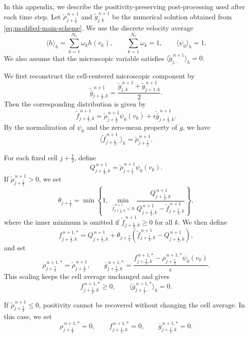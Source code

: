 \documentclass[11pt,twoside]{article}
\numberwithin{equation}{section}
\theoremstyle{plain}
\theoremstyle{nonumberplain}
\begin{document}
{In this appendix, we describe the positivity-preserving post-processing
used after each time step. Let
\(\tilde{\rho}_{j+\frac12}^{\,n+1}\) and
\(\tilde g_{j,k}^{\,n+1}\) be the numerical solution obtained from
\eqref{eq:modified-main-scheme}. We use the discrete velocity average
\[
    \langle h\rangle_h
    =
    \sum_{k=1}^{N_v}\omega_k h(v_k),
    \qquad
    \sum_{k=1}^{N_v}\omega_k=1,
    \qquad
    \langle \psi_0\rangle_h=1 .
\]
We also assume that the microscopic variable satisfies
\(\langle \tilde g_{j,\cdot}^{\,n+1}\rangle_h=0\).

We first reconstruct the cell-centered microscopic component by
\[
    \tilde{\bar g}_{j+\frac12,k}^{\,n+1}
    =
    \frac{
    \tilde g_{j,k}^{\,n+1}
    +
    \tilde g_{j+1,k}^{\,n+1}
    }{2}.
\]
Then the corresponding distribution is given by
\[
    \tilde f_{j+\frac12,k}^{\,n+1}
    =
    \tilde\rho_{j+\frac12}^{\,n+1}\psi_0(v_k)
    +
    \epsilon \tilde{\bar g}_{j+\frac12,k}^{\,n+1}.
\]
By the normalization of \(\psi_0\) and the zero-mean property of \(g\),
we have
\[
    \langle \tilde f_{j+\frac12,\cdot}^{\,n+1}\rangle_h
    =
    \tilde\rho_{j+\frac12}^{\,n+1}.
\]

For each fixed cell \(j+\frac12\), define
\[
    Q_{j+\frac12,k}^{\,n+1}
    =
    \tilde\rho_{j+\frac12}^{\,n+1}\psi_0(v_k).
\]
If \(\tilde\rho_{j+\frac12}^{\,n+1}>0\), we set
\[
    \theta_{j+\frac12}
    =
    \min\left\{
    1,\,
    \min_{\tilde f_{j+\frac12,k}^{\,n+1}<0}
    \frac{
    Q_{j+\frac12,k}^{\,n+1}
    }{
    Q_{j+\frac12,k}^{\,n+1}
    -
    \tilde f_{j+\frac12,k}^{\,n+1}
    }
    \right\},
\]
where the inner minimum is omitted if
\(\tilde f_{j+\frac12,k}^{\,n+1}\ge0\) for all \(k\). We then define
\[
    f_{j+\frac12,k}^{\,n+1,*}
    =
    Q_{j+\frac12,k}^{\,n+1}
    +
    \theta_{j+\frac12}
    \left(
    \tilde f_{j+\frac12,k}^{\,n+1}
    -
    Q_{j+\frac12,k}^{\,n+1}
    \right),
\]
and set
\[
    \rho_{j+\frac12}^{\,n+1,*}
    =
    \tilde\rho_{j+\frac12}^{\,n+1},
    \qquad
    \bar g_{j+\frac12,k}^{\,n+1,*}
    =
    \frac{
    f_{j+\frac12,k}^{\,n+1,*}
    -
    \rho_{j+\frac12}^{\,n+1,*}\psi_0(v_k)
    }{\epsilon}.
\]
This scaling keeps the cell average unchanged and gives
\[
    f_{j+\frac12,k}^{\,n+1,*}\ge0,
    \qquad
    \langle \bar g_{j+\frac12,\cdot}^{\,n+1,*}\rangle_h=0 .
\]

If \(\tilde\rho_{j+\frac12}^{\,n+1}\le0\), positivity cannot be recovered
without changing the cell average. In this case, we set
\[
    \rho_{j+\frac12}^{\,n+1,*}=0,
    \qquad
    f_{j+\frac12,k}^{\,n+1,*}=0,
    \qquad
    \bar g_{j+\frac12,k}^{\,n+1,*}=0 .
\]

}
\end{document}
